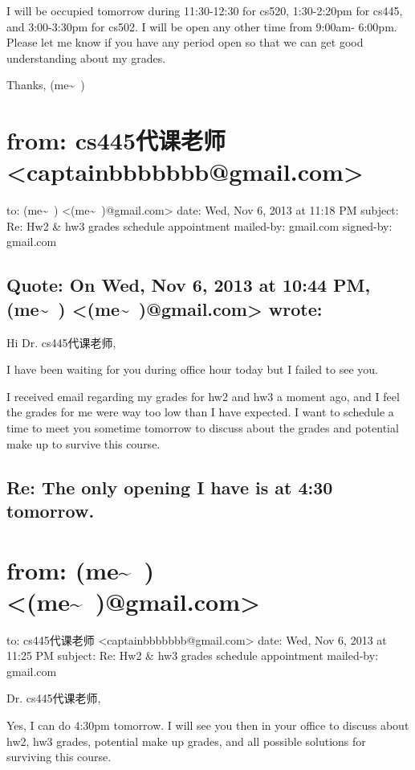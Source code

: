 \documentclass[12pt]{book}
\begin{document}
I will be occupied tomorrow during 11:30-12:30 for cs520, 1:30-2:20pm for cs445, and 3:00-3:30pm for cs502. I will be open any other time from 9:00am- 6:00pm. Please let me know if you have any period open so that we can get good understanding about my grades. 

Thanks,
(me\textasciitilde{}~)

\section{from:         cs445代课老师 <captainbbbbbbb@gmail.com>}
\label{sec-41-4}
to:         (me\textasciitilde{}~) <(me\textasciitilde{}~)@gmail.com>
date:         Wed, Nov 6, 2013 at 11:18 PM
subject:         Re: Hw2 \& hw3 grades  schedule appointment
mailed-by:         gmail.com
signed-by:         gmail.com

\subsection{Quote: On Wed, Nov 6, 2013 at 10:44 PM, (me\textasciitilde{}~) <(me\textasciitilde{}~)@gmail.com> wrote:}
\label{sec-41-4-1}
Hi Dr. cs445代课老师, 

I have been waiting for you during office hour today but I failed to see you. 

I received email regarding my grades for hw2 and hw3 a moment ago, and I feel the grades for me were way too low than I have expected. I want to schedule a time to meet you sometime tomorrow to discuss about the grades and potential make up to survive this course. 

\subsection{Re: The only opening I have is at 4:30 tomorrow.}
\label{sec-41-4-2}

\section{from:         (me\textasciitilde{}~) <(me\textasciitilde{}~)@gmail.com>}
\label{sec-41-5}
to:         cs445代课老师 <captainbbbbbbb@gmail.com>
date:         Wed, Nov 6, 2013 at 11:25 PM
subject:         Re: Hw2 \& hw3 grades  schedule appointment
mailed-by:         gmail.com

Dr. cs445代课老师, 

Yes, I can do 4:30pm tomorrow. I will see you then in your office to discuss about hw2, hw3 grades, potential make up grades, and all possible solutions for surviving this course. 
\end{document}

